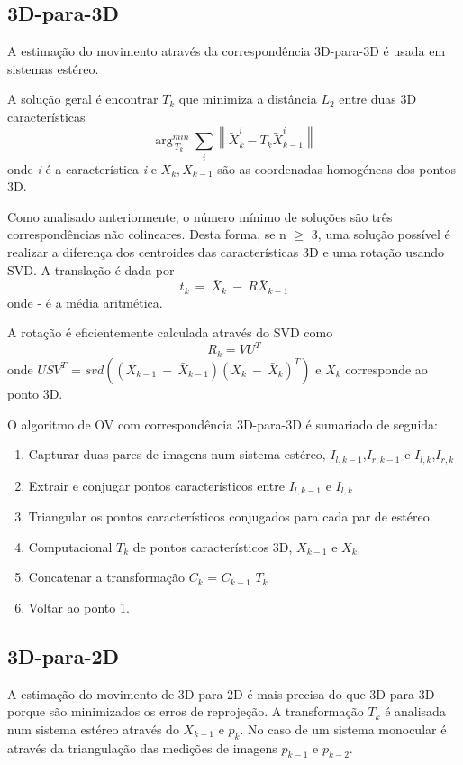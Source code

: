 \subsection{3D-para-3D}

A estimação do movimento através da correspondência 3D-para-3D é usada em sistemas estéreo. 

A solução geral é encontrar \textit{$T_k$} que minimiza a distância \textit{$L_2$} entre duas 3D características \[ \arg_{\ T_k}^{min}\sum_{i}{\left \| \tilde{X}_k^i - T_k\tilde{X}_{k-1}^i \right \|} \] 
onde \textit{i} é a característica \textit{i} e \textit{$X_{k},X_{k-1}$} são as coordenadas homogéneas dos pontos 3D. 

Como analisado anteriormente, o número mínimo de soluções são três correspondências não colineares. Desta forma, se n $\geq$ 3, uma solução possível é realizar a diferença dos centroides das características 3D e uma rotação usando SVD. A translação é dada por \[ t_{k\ }=\ {\bar{X}}_k\ -\ R{\bar{X}}_{k-1} \] onde - é a média aritmética.

A rotação é eficientemente calculada através do SVD como \[ R_k = VU^T \] onde $USV^T$ = $svd({(X_{k-1}\ -\ {\bar{X}}_{k-1})(X_k\ -\ {\bar{X}}_k)}^T)$ e \textit{$X_k$} corresponde ao ponto 3D.

O algoritmo de OV com correspondência 3D-para-3D é sumariado de seguida:
\begin{enumerate}
	\item Capturar duas pares de imagens num sistema estéreo, \textit{$I_{l,k-1}$},\textit{$I_{r,k-1}$} e \textit{$I_{l,k}$},\textit{$I_{r,k}$}
	\item Extrair e conjugar pontos característicos entre \textit{$I_{l,k-1}$} e \textit{$I_{l,k}$}
	\item Triangular os pontos característicos conjugados para cada par de estéreo.
	\item Computacional \textit{$T_k$} de pontos característicos 3D, \textit{$X_{k-1}$} e \textit{$X_k$}  
	\item Concatenar a transformação $C_k$ = $ C_{k-1}$ $T_k$
	\item Voltar ao ponto 1.
\end{enumerate}



\subsection{3D-para-2D}

A estimação do movimento de 3D-para-2D é mais precisa do que 3D-para-3D porque são minimizados os erros de reprojeção. A transformação \textit{$T_k$} é analisada num sistema estéreo através do \textit{$X_{k-1}$} e \textit{$p_k$}. No caso de um sistema monocular é através da triangulação das medições de imagens \textit{$p_{k-1}$} e \textit{$p_{k-2}$}. 

